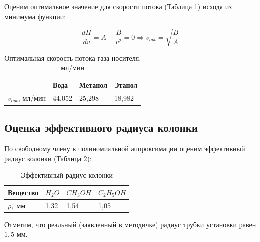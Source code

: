 \documentclass{article}
\begin{document}
\newpage
\par Оценим оптимальное значение для скорости потока (Таблица \ref{tab:v_opt}) исходя из минимума функции:

\begin{equation*}
    \frac{dH}{dv} = A - \frac{B}{v^2} = 0 \Rightarrow {v_{opt} = \sqrt{\frac{B}{A}}}
\end{equation*}
\begin{table}[h!]
\centering
\begin{tabular}{|l|l|l|l|}
\hline
             & Вода   & Метанол & Этанол \\ \hline
$v_{opt}$, мл/мин & 44,052 & 25,298  & 18,982 \\ \hline
\end{tabular}
\caption{Оптимальная скорость потока газа-носителя, мл/мин}
\label{tab:v_opt}
\end{table}
\newpage

\subsection{Оценка эффективного радиуса колонки}\;
По свободному члену в полиномиальной аппроксимации оценим эффективный радиус колонки (Таблица \ref{Радиус}):

\begin{table}[h!]
\centering
\caption{Эффективный радиус колонки}
\begin{tabular}{|l|l|l|l|}
\hline
Вещество & $H_2O$ & $CH_3OH$ & $C_2H_5OH$ \\ \hline
$\rho,\; $мм & 1,32 & 1,54 & 1,05 \\ \hline
\end{tabular}
\label{Радиус}
\end{table}

Отметим, что реальный (заявленный в методичке) радиус трубки установки равен $1,5$ мм.
\newpage
\end{document}
